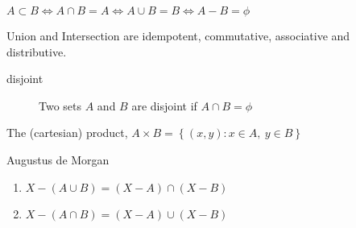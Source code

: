 	\begin{remark}
		$A \subset B \iff A \cap B = A \iff A \cup B = B \iff A - B = \phi$
	\end{remark}
	\begin{remark}
		Union and Intersection are idempotent, commutative, associative and distributive.
	\end{remark}
	\begin{description}
		\item[disjoint] Two sets $A$ and $B$ are disjoint if $A \cap B = \phi$
	\end{description}
	\begin{definition}
		The (cartesian) product, $A \times B =\  \{\ (x,y) : x \in A,\ y \in B\ \}$
	\end{definition}
	\begin{theorem} Augustus de Morgan
		\begin{enumerate}
			\item $X - (A \cup B) = (X-A) \cap (X-B)$
			\item $X - (A \cap B) = (X-A) \cup (X-B)$
		\end{enumerate}
	\end{theorem}
